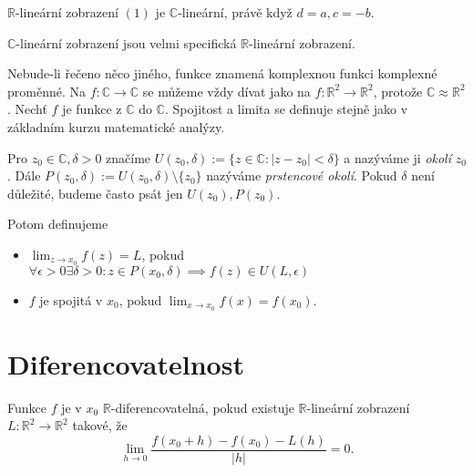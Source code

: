 \begin{observation}
$\mathbb{R}$-lineární zobrazení $(1)$ je $\mathbb{C}$-lineární, právě když $d = a, c = -b$.
\end{observation} 

\begin{note}
$\mathbb{C}$-lineární zobrazení jsou velmi specifická $\mathbb{R}$-lineární zobrazení.
\end{note}

\begin{agreement}
Nebude-li řečeno něco jiného, funkce znamená komplexnou funkci komplexné proměnné. Na $f: \mathbb{C} \to \mathbb{C}$ se můžeme vždy dívat jako na $f: \mathbb{R}^2 \to \mathbb{R}^2$, protože $\mathbb{C}\approx\mathbb{R}^2$.
Nechť $f$ je funkce z $\mathbb{C}$ do $\mathbb{C}$. Spojitost a limita se definuje stejně jako v základním kurzu matematické analýzy.
\end{agreement}

\begin{definition}
Pro $z_0\in\mathbb{C}, \delta>0$ značíme $U(z_0,\delta):= \{z\in\mathbb{C}: |z-z_0|<\delta\}$ a nazýváme ji \textit{okolí} $z_0$. Dále $P(z_0,\delta):= U(z_0,\delta)\setminus\{z_0\}$ nazýváme \textit{prstencové okolí}. Pokud $\delta$ není důležité, budeme často psát jen $U(z_0), P(z_0)$.

Potom definujeme
\begin{itemize}
    \item $\lim_{z\to x_0} {f(z)} = L$, pokud $\forall\epsilon>0\exists\delta>0:z\in P(x_0,\delta)\implies f(z)\in U(L, \epsilon)$
    \item $f$ je spojitá v $x_0$, pokud $\lim_{x\to x_0}{f(x)} = f(x_0)$.
\end{itemize}
\end{definition} 


\section{Diferencovatelnost}

\begin{definition}
Funkce $f$ je v $x_0$ $\mathbb{R}$-diferencovatelná, pokud existuje $\mathbb{R}$-lineární zobrazení \\$L: \mathbb{R}^2\to\mathbb{R}^2$ takové, že
$$\lim_{h\to 0}\frac{f(x_0+h)-f(x_0)-L(h)}{|h|} = 0.$$
\end{definition} 

